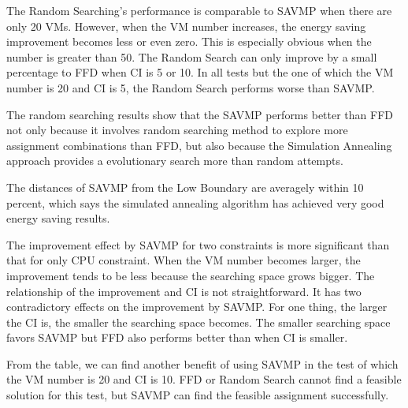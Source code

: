 \documentclass[10pt, conference, compsocconf]{IEEEtran}
\begin{document}
The Random Searching's performance is comparable to SAVMP when there are only 20
VMs. However, when the VM number increases, the energy saving improvement
becomes less or even zero. This is especially obvious when the number is greater
than 50.
The Random Search can only improve by a small percentage to FFD when CI is 5 or 10. In all
tests but the one of which the VM number is 20 and CI is 5, the Random Search
performs worse than SAVMP.

The random searching results show that the SAVMP performs better than FFD
not only because it involves random searching method to explore more assignment
combinations than FFD, but also because the Simulation Annealing approach
provides a evolutionary search more than random attempts.

The distances of SAVMP from the Low Boundary are averagely within 10 percent,
which says the simulated annealing algorithm has achieved very good energy
saving results.

The improvement effect by SAVMP for two constraints is more significant than
that for only CPU constraint. When the VM number becomes larger, the improvement
tends to be less because the searching space grows bigger. The relationship of
the improvement and CI is not straightforward. It has two contradictory effects
on the improvement by SAVMP. For one thing, the larger the CI is, the smaller
the searching space becomes. The smaller searching space favors SAVMP but FFD
also performs better than when CI is smaller.

From the table, we can find another benefit of using SAVMP in the test of which
the VM number is 20 and CI is 10. FFD or Random Search cannot find a feasible
solution for this test, but SAVMP can find the feasible assignment successfully.

\end{document}
